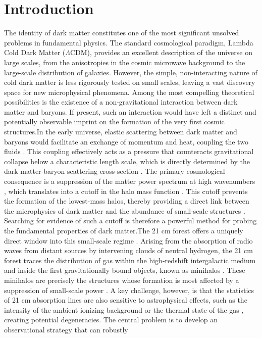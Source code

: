 \documentclass[]{article}
\begin{document}
\section{Introduction}
\label{sec:intro}
The identity of dark matter constitutes one of the most significant unsolved problems in fundamental physics. The standard cosmological paradigm, Lambda Cold Dark Matter ($\Lambda$CDM), provides an excellent description of the universe on large scales, from the anisotropies in the cosmic microwave background to the large-scale distribution of galaxies. However, the simple, non-interacting nature of cold dark matter is less rigorously tested on small scales, leaving a vast discovery space for new microphysical phenomena. Among the most compelling theoretical possibilities is the existence of a non-gravitational interaction between dark matter and baryons. If present, such an interaction would have left a distinct and potentially observable imprint on the formation of the very first cosmic structures.In the early universe, elastic scattering between dark matter and baryons would facilitate an exchange of momentum and heat, coupling the two fluids \citep{dvorkin2013constrainingdarkmatterbaryonscattering,das2025darksecretsbaryonsilluminating}. This coupling effectively acts as a pressure that counteracts gravitational collapse below a characteristic length scale, which is directly determined by the dark matter-baryon scattering cross-section \citep{slatyer2018earlyuniverseconstraintsdarkmatterbaryon}. The primary cosmological consequence is a suppression of the matter power spectrum at high wavenumbers \citep{zhang2024weaklensingconstraintsdark,das2025darksecretsbaryonsilluminating}, which translates into a cutoff in the halo mass function \citep{dvorkin2013constrainingdarkmatterbaryonscattering}. This cutoff prevents the formation of the lowest-mass halos, thereby providing a direct link between the microphysics of dark matter and the abundance of small-scale structures \citep{dvorkin2013constrainingdarkmatterbaryonscattering}. Searching for evidence of such a cutoff is therefore a powerful method for probing the fundamental properties of dark matter.The 21 cm forest offers a uniquely direct window into this small-scale regime \citep{ciardi201521cmforestska,shimabukuro2026topologicalsignaturesheatingdark}. Arising from the absorption of radio waves from distant sources by intervening clouds of neutral hydrogen, the 21 cm forest traces the distribution of gas within the high-redshift intergalactic medium and inside the first gravitationally bound objects, known as minihalos \citep{ciardi201521cmforestska,shimabukuro2026topologicalsignaturesheatingdark}. These minihalos are precisely the structures whose formation is most affected by a suppression of small-scale power \citep{ciardi201521cmforestska,shimabukuro2025analyzing21cmforestwavelet}. A key challenge, however, is that the statistics of 21 cm absorption lines are also sensitive to astrophysical effects, such as the intensity of the ambient ionizing background or the thermal state of the gas \citep{ciardi201521cmforestska,šoltinský2021detectabilitystrong21centimetre}, creating potential degeneracies. The central problem is to develop an observational strategy that can robustly 
\end{document}
